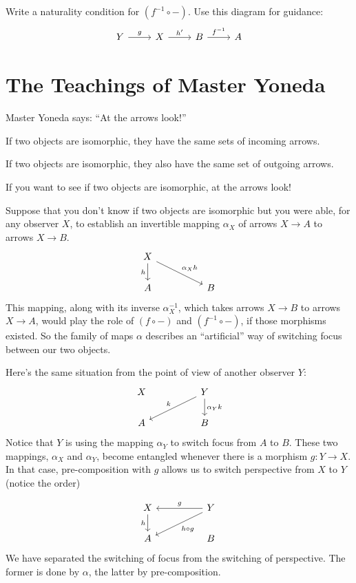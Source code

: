 \documentclass[DaoFP]{subfiles}
\begin{document}
\begin{exercise}
Write a naturality condition for $(f^{-1} \circ -)$. Use this diagram for guidance:
\[
 \begin{tikzcd}
 Y \arrow[r, "g"] &X \arrow[r, "h'"] & B \arrow[r, "f^{-1}"] & A
\end{tikzcd}
\]

\end{exercise}

\section{The Teachings of Master Yoneda}

Master Yoneda says: ``At the arrows look!''

If two objects are isomorphic, they have the same sets of incoming arrows. 

If two objects are isomorphic, they also have the same set of outgoing arrows.

If you want to see if two objects are isomorphic, at the arrows look!

Suppose that you don't know if two objects are isomorphic but you were able, for any observer $X$, to establish an invertible mapping $\alpha_X$ of arrows $X \to A$ to arrows $X \to B$. 
\[
 \begin{tikzcd}
 X
 \arrow[d, "h"']
 \arrow[rrd, "\alpha_X h"]
  \\
 A
  && B
 \end{tikzcd}
\]
This mapping, along with its inverse $\alpha^{-1}_X$, which takes arrows $X \to B$ to arrows $X \to A$, would play the role of $(f \circ -)$ and $(f^{-1} \circ -)$, if those morphisms existed. So the family of maps $\alpha$ describes an ``artificial'' way of switching focus between our two objects.

Here's the same situation from the point of view of another observer $Y$:
\[
 \begin{tikzcd}
 X
  && Y
 \arrow[lld, "k"']
 \arrow[d, "\alpha_Y k"]
 \\
 A
  && B
 \end{tikzcd}
\]
Notice that $Y$ is using the mapping $\alpha_Y$ to switch focus from $A$ to $B$. These two mappings, $\alpha_X$ and $\alpha_Y$, become entangled whenever there is a morphism $g \colon Y \to X$. In that case, pre-composition with $g$ allows us to switch perspective from $X$ to $Y$ (notice the order)

\[
 \begin{tikzcd}
 X
 \arrow[d, "h"']
 && Y
 \arrow[ll, "g"']
 \arrow[lld, "h \circ g"]
 \\
 A
  && B
 \end{tikzcd}
\]
We have separated the switching of focus from the switching of perspective. The former is done by $\alpha$, the latter by pre-composition.
\end{document}
